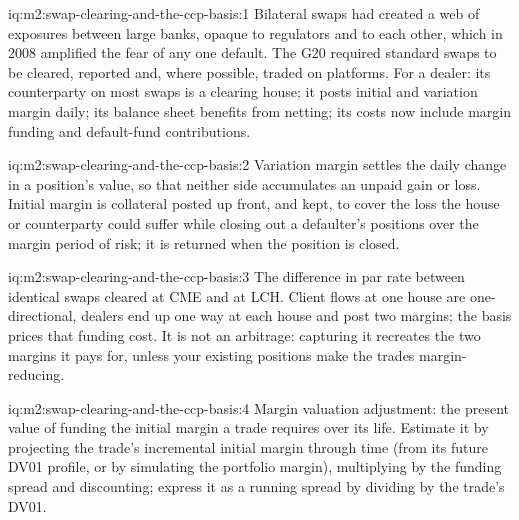 \begin{solution}{iq:m2:swap-clearing-and-the-ccp-basis:1}
Bilateral swaps had created a web of exposures between large banks, opaque to
regulators and to each other, which in 2008 amplified the fear of any one
default. The G20 required standard swaps to be cleared, reported and, where
possible, traded on platforms. For a dealer: its counterparty on most swaps
is a clearing house; it posts initial and variation margin daily; its
balance sheet benefits from netting; its costs now include margin funding and
default-fund contributions.
\end{solution}

\begin{solution}{iq:m2:swap-clearing-and-the-ccp-basis:2}
Variation margin settles the daily change in a position's value, so that
neither side accumulates an unpaid gain or loss. Initial margin is collateral
posted up front, and kept, to cover the loss the house or counterparty could
suffer while closing out a defaulter's positions over the margin period of
risk; it is returned when the position is closed.
\end{solution}

\begin{solution}{iq:m2:swap-clearing-and-the-ccp-basis:3}
The difference in par rate between identical swaps cleared at CME and at LCH.
Client flows at one house are one-directional, dealers end up one way at
each house and post two margins; the basis prices that funding cost. It is not
an arbitrage: capturing it recreates the two margins it pays for, unless your
existing positions make the trades margin-reducing.
\end{solution}

\begin{solution}{iq:m2:swap-clearing-and-the-ccp-basis:4}
Margin valuation adjustment: the present value of funding the initial margin a
trade requires over its life. Estimate it by projecting the trade's
incremental initial margin through time (from its future DV01 profile, or by
simulating the portfolio margin), multiplying by the funding spread and
discounting; express it as a running spread by dividing by the trade's DV01.
\end{solution}

